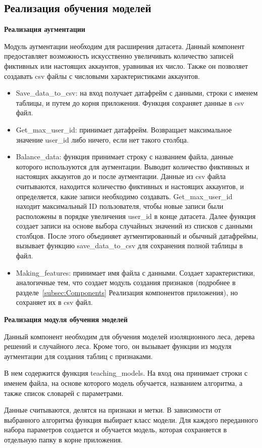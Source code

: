 \label{sec:Realisation}
\subsection{Реализация обучения моделей}

\textbf{Реализация аугментации}

Модуль аугментации необходим для расширения датасета. Данный компонент предоставляет возможность искусственно увеличивать количество записей фиктивных или настоящих аккаунтов, уравнивая их число. Также он позволяет создавать csv файлы с числовыми характеристиками аккаунтов.

\begin{itemize}[itemindent=2cm, leftmargin=0cm, labelsep=0.3cm, topsep=0cm, itemsep=0cm, parsep=0cm, before=\vspace{-0.15cm}, after=\vspace{-0.15cm}]
    \item Save\_data\_to\_csv: на вход получает датафрейм с данными, строки с именем таблицы, и путем до корня приложения. Функция сохраняет данные в csv файл.
    \item Get\_max\_user\_id: принимает датафрейм. Возвращает максимальное значение user\_id либо ничего, если нет такого столбца. 
    \item Balance\_data: функция принимает строку с названием файла, данные которого используются для аугментации. Выводит количество фиктивных и настоящих аккаунтов до и после аугментации. Данные из csv файла считываются, находится количество фиктивных и настоящих аккаунтов, и определяется, какие записи необходимо создавать. Get\_max\_user\_id находит максимальный ID пользователя, чтобы новые записи были расположены в порядке увеличения user\_id в конце датасета. Далее функция создает записи на основе выбора случайных значений из списков с данными столбцов. После этого объединяет аугментированный и обычный датафреймы, вызывает функцию save\_data\_to\_csv для сохранения полной таблицы в файл.
    \item Making\_features: принимает имя файла с данными. Создает характеристики, аналогичные тем, что создает модуль создания признаков (подробнее в разделе~\ref{subsec:Components} Реализация компонентов приложения), но сохраняет их в csv файл.
\end{itemize}


\textbf{Реализация модуля обучения моделей}

Данный компонент необходим для обучения моделей изоляционного леса, дерева решений и случайного леса. Кроме того, он вызывает функции из модуля аугментации для создания таблиц с признаками. 

В нем содержится функция teaching\_models. На вход она принимает строки с именем файла, на основе которого модель обучается, названием алгоритма, а также список словарей с параметрами. 
    
Данные считываются, делятся на признаки и метки. В зависимости от выбранного алгоритма функция выбирает класс модели. Для каждого переданного набора параметров создается и обучается модель, которая сохраняется в отдельную папку в корне приложения.
